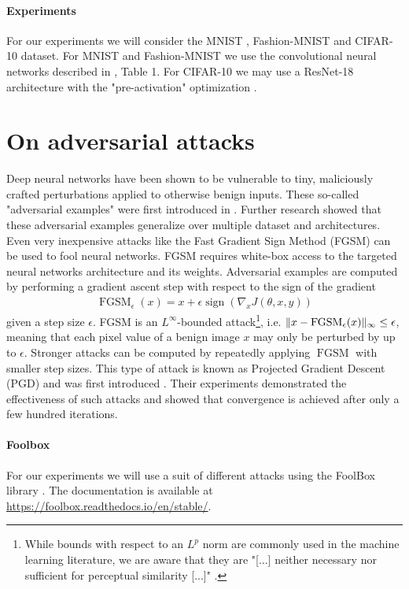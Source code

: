 \documentclass{article}
\begin{document}
\paragraph{Experiments}
For our experiments we will consider the MNIST \cite{deng2012mnist}, Fashion-MNIST \cite{xiao2017fashion} and CIFAR-10 \cite{krizhevsky2009learning} dataset. For MNIST and Fashion-MNIST we use the convolutional neural networks described in \cite{carlini2017towards}, Table 1. For CIFAR-10 we may use a ResNet-18 architecture \cite{he2016deep} with the "pre-activation" optimization \cite{he2016identity}. 

	
\section{On adversarial attacks}
Deep neural networks have been shown to be vulnerable to tiny, maliciously crafted perturbations applied to otherwise benign inputs. These so-called "adversarial examples" were first introduced in \cite{Szegedy13}. Further research \cite{goodfellow2014explaining} showed that these adversarial examples generalize over multiple dataset and architectures. Even very inexpensive attacks like the Fast Gradient Sign Method (FGSM) \cite{goodfellow2014explaining} can be used to fool neural networks. FGSM requires white-box access to the targeted neural networks architecture and its weights. Adversarial examples are computed by performing a gradient ascent step with respect to the sign of the gradient
\begin{align*}
	\operatorname{FGSM}_\epsilon(x) = x + \epsilon\operatorname{sign}(\nabla_x J(\theta,x,y)) 
\end{align*}
given a step size $\epsilon$. FGSM is an $L^\infty$-bounded attack\footnote{While bounds with respect to an $L^p$ norm are commonly used in the machine learning literature, we are aware that they are "[...] neither necessary nor sufficient for perceptual similarity [...]" \cite{sharif2018suitability}.}, i.e. $\lVert x-\operatorname{FGSM}_\epsilon(x)\rVert_\infty\le\epsilon$, meaning that each pixel value of a benign image $x$ may only be perturbed by up to $\epsilon$.
Stronger attacks can be computed by repeatedly applying $\operatorname{FGSM}$ with smaller step sizes. This type of attack is known as Projected Gradient Descent (PGD) and was first introduced \cite{madry2017towards}. Their experiments demonstrated the effectiveness of such attacks and showed that convergence is achieved after only a few hundred iterations. 

\paragraph{Foolbox}
For our experiments we will use a suit of different attacks using the FoolBox library \cite{rauber2017foolbox}. The documentation is available at \url{https://foolbox.readthedocs.io/en/stable/}. 



\end{document}
